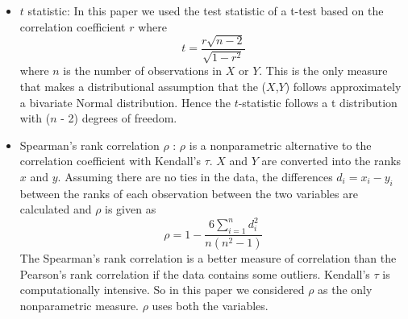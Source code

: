 \begin{itemize}
\item $t$ statistic: In this paper we used the test statistic of a t-test based on the correlation coefficient $r$ where $$t =\frac{r \sqrt{n - 2}}{\sqrt{1 - r^2}}$$ where $n$ is the number of observations in $X$ or $Y$. This is the only measure that makes a distributional assumption that the ($X$,$Y$) follows approximately a bivariate Normal distribution. Hence the $t$-statistic follows a t distribution with ($n$ - 2) degrees of freedom.


\item Spearman's rank correlation $\rho$ : $\rho$ is a nonparametric alternative to the correlation coefficient with Kendall's $\tau$. $X$ and $Y$ are converted into the ranks $x$ and $y$. Assuming there are no ties in the data, the differences $d_i=x_i - y_i$ between the ranks of each observation between the two variables are calculated and $\rho$ is given as $$\rho = 1 - \frac{6\sum_{i=1}^n d_i^2}{n(n^2 - 1)}$$ The Spearman's rank correlation is a better measure of correlation than the Pearson's rank correlation if the data contains some outliers. Kendall's $\tau$ is computationally intensive.
So in this paper we considered $\rho$ as the only nonparametric measure.
$\rho$ uses both the variables. 

\end{itemize}

